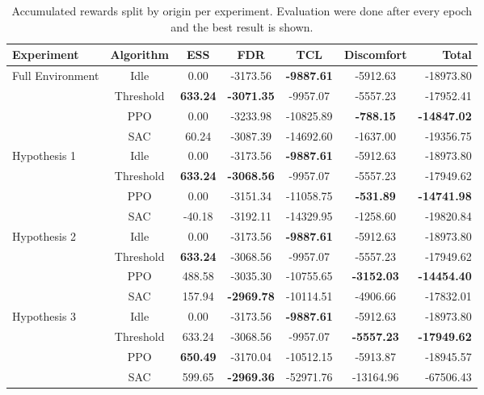 \begin{table}[t]
\label{tab:experiments}
\caption{Accumulated rewards split by origin per experiment. Evaluation were done after every epoch and the best result is shown.}
\vskip 0.15in
\begin{center}
\begin{small}
\begin{sc}
\begin{tabular}{lcccccr}
\toprule
Experiment & Algorithm & ESS & FDR & TCL & Discomfort & Total \\
\midrule
\multirow{4}{*}{Full Environment} 
    & Idle      & 0.00   & -3173.56 & \textbf{-9887.61}  & -5912.63 & -18973.80 \\
    & Threshold & \textbf{633.24} & \textbf{-3071.35} & -9957.07  & -5557.23 & -17952.41 \\
    & PPO       & 0.00   & -3233.98 & -10825.89 & \textbf{-788.15} & \textbf{-14847.02} \\
    & SAC       & 60.24  & -3087.39 & -14692.60 & -1637.00 & -19356.75 \\
\midrule
\multirow{4}{*}{Hypothesis 1}
    & Idle      & 0.00   & -3173.56 & \textbf{-9887.61} & -5912.63 & -18973.80 \\
    & Threshold & \textbf{633.24} & \textbf{-3068.56} & -9957.07 & -5557.23 & -17949.62 \\
    & PPO       & 0.00   & -3151.34 & -11058.75& \textbf{-531.89} & \textbf{-14741.98} \\
    & SAC       & -40.18 & -3192.11 & -14329.95 & -1258.60 & -19820.84 \\
\midrule
\multirow{4}{*}{Hypothesis 2} 
    & Idle      & 0.00   & -3173.56 & \textbf{-9887.61} & -5912.63 & -18973.80 \\
    & Threshold & \textbf{633.24} & -3068.56 & -9957.07 & -5557.23 & -17949.62 \\
    & PPO       & 488.58 & -3035.30 & -10755.65 & \textbf{-3152.03} & \textbf{-14454.40} \\
    & SAC       & 157.94 & \textbf{-2969.78} & -10114.51 & -4906.66 & -17832.01 \\
\midrule
\multirow{4}{*}{Hypothesis 3} 
    & Idle      & 0.00   & -3173.56 & \textbf{-9887.61} & -5912.63 & -18973.80 \\
    & Threshold & 633.24 & -3068.56 & -9957.07 & \textbf{-5557.23} & \textbf{-17949.62} \\
    & PPO       & \textbf{650.49} & -3170.04 & -10512.15 & -5913.87 & -18945.57 \\
    & SAC       & 599.65 & \textbf{-2969.36} & -52971.76 & -13164.96 & -67506.43 \\
\bottomrule
\end{tabular}
\end{sc}
\end{small}
\end{center}
\vskip -0.1in
\end{table}

